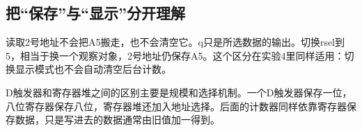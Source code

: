 \subsection{把“保存”与“显示”分开理解}
读取2号地址不会把A5搬走，也不会清空它。q只是所选数据的输出。切换rsel到5，相当于换一个观察对象，2号地址仍保存A5。这个区分在实验4里同样适用：切换显示模式也不会自动清空后台计数。

D触发器和寄存器堆之间的区别主要是规模和选择机制。一个D触发器保存一位，八位寄存器保存八位，寄存器堆还加入地址选择。后面的计数器同样依靠寄存器保存数据，只是写进去的数据通常由旧值加一得到。
